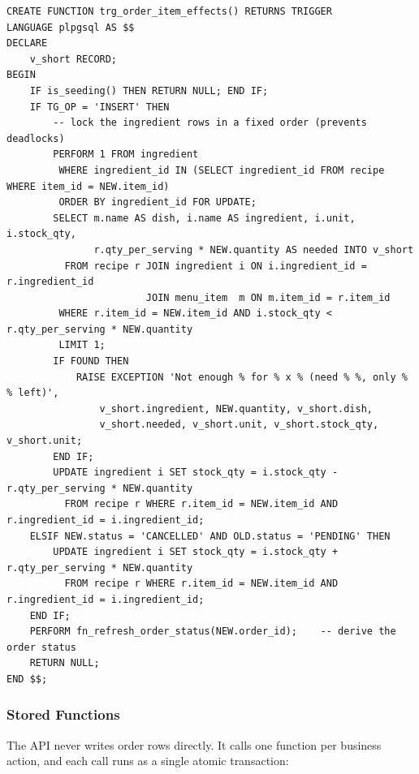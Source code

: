 \documentclass[11pt,a4paper]{report}
\begin{document}
\begin{lstlisting}[caption={Stock-deduction trigger (abridged)}]
CREATE FUNCTION trg_order_item_effects() RETURNS TRIGGER
LANGUAGE plpgsql AS $$
DECLARE
    v_short RECORD;
BEGIN
    IF is_seeding() THEN RETURN NULL; END IF;
    IF TG_OP = 'INSERT' THEN
        -- lock the ingredient rows in a fixed order (prevents deadlocks)
        PERFORM 1 FROM ingredient
         WHERE ingredient_id IN (SELECT ingredient_id FROM recipe WHERE item_id = NEW.item_id)
         ORDER BY ingredient_id FOR UPDATE;
        SELECT m.name AS dish, i.name AS ingredient, i.unit, i.stock_qty,
               r.qty_per_serving * NEW.quantity AS needed INTO v_short
          FROM recipe r JOIN ingredient i ON i.ingredient_id = r.ingredient_id
                        JOIN menu_item  m ON m.item_id = r.item_id
         WHERE r.item_id = NEW.item_id AND i.stock_qty < r.qty_per_serving * NEW.quantity
         LIMIT 1;
        IF FOUND THEN
            RAISE EXCEPTION 'Not enough % for % x % (need % %, only % % left)',
                v_short.ingredient, NEW.quantity, v_short.dish,
                v_short.needed, v_short.unit, v_short.stock_qty, v_short.unit;
        END IF;
        UPDATE ingredient i SET stock_qty = i.stock_qty - r.qty_per_serving * NEW.quantity
          FROM recipe r WHERE r.item_id = NEW.item_id AND r.ingredient_id = i.ingredient_id;
    ELSIF NEW.status = 'CANCELLED' AND OLD.status = 'PENDING' THEN
        UPDATE ingredient i SET stock_qty = i.stock_qty + r.qty_per_serving * NEW.quantity
          FROM recipe r WHERE r.item_id = NEW.item_id AND r.ingredient_id = i.ingredient_id;
    END IF;
    PERFORM fn_refresh_order_status(NEW.order_id);    -- derive the order status
    RETURN NULL;
END $$;
\end{lstlisting}

\subsubsection{Stored Functions}
The API never writes order rows directly. It calls one function per business action, and each call runs as a single atomic transaction:
\end{document}
